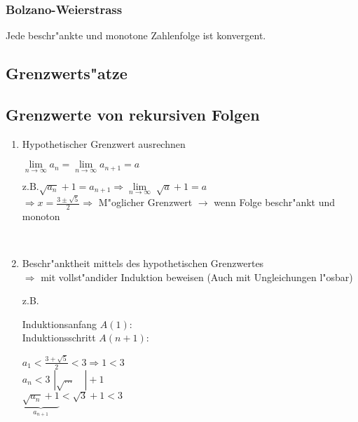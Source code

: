 \subsubsection{Bolzano-Weierstrass}
	Jede beschr"ankte und monotone Zahlenfolge ist konvergent.

\subsection{Grenzwerts"atze}

\subsection{Grenzwerte von rekursiven Folgen}

\begin{flushleft}
\begin{enumerate}
	\item Hypothetischer Grenzwert ausrechnen \\[5pt]
		\begin{minipage}[t]{4.5cm}
			$  \lim\limits_{n\rightarrow\infty} a_n = \lim\limits_{n\rightarrow\infty} a_{n+1} = a $
			\end{minipage}
			\begin{minipage}[t]{12cm}
			$\text{z.B.}\sqrt{a_n}+1=a_{n+1}\Rightarrow\lim\limits_{n\rightarrow\infty}\;\sqrt{a}+1 = a$\\
			$\Rightarrow x=\frac{3\pm\sqrt{5}}{2}\Rightarrow$ M"oglicher Grenzwert $\rightarrow$ wenn Folge beschr"ankt und monoton 
			\end{minipage}\\[5pt]	

	\item Beschr"anktheit mittels des hypothetischen Grenzwertes\\
$\Rightarrow$ mit vollst"andider Induktion beweisen (Auch mit Ungleichungen l"osbar)\\
			\begin{minipage}[t]{20cm}
				\begin{minipage}[t]{1cm}
					z.B.
				\end{minipage}
				\begin{minipage}[t]{5cm}
					Induktionsanfang $A(1)$:\\
					Induktionsschritt $A(n+1)$:\\
				\end{minipage}
				\begin{minipage}[t]{15cm}
					$a_1 < \frac{3+\sqrt{5}}{2} < 3 \Rightarrow 1 < 3 $\\
					$a_n < 3$ \hspace{5cm}$|\sqrt{...}\quad |+1$\\
					$\underbrace{\sqrt{a_n}+1}_{a_{n+1}} < \sqrt{3}+1 < 3$\\
				\end{minipage}   
			\end{minipage}  




\end{enumerate}
\end{flushleft}
